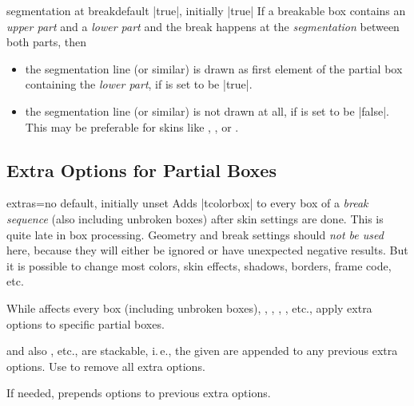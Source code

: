 \begin{docTcbKey}[][doc new=2017-03-20]{segmentation at break}{}{default |true|, initially |true|}
  If a breakable box contains an \emph{upper part} and a \emph{lower part} and
  the break happens at the \emph{segmentation} between both parts, then
  \begin{itemize}
  \item the segmentation line (or similar) is drawn as first element of the
    partial box containing the \emph{lower part}, if 
    is set to be |true|.
  \item the segmentation line (or similar) is not drawn at all, if
     is set to be |false|.
    This may be preferable for skins like , ,
    or .
  \end{itemize}
\end{docTcbKey}


\clearpage
\subsection{Extra Options for Partial Boxes}\label{subsec:extras}


\begin{docTcbKey}[][doc new=2015-07-16]{extras}{=}{no default, initially unset}
  Adds |tcolorbox|  to every box of a \emph{break sequence}
  (also including unbroken boxes) after skin settings are done. This is quite late in box processing.
  Geometry and break settings should \emph{not be used} here, because they
  will either be ignored or have unexpected negative results. But it is possible
  to change most colors, skin effects, shadows, borders, frame code, etc.\par
  While  affects every box (including unbroken boxes),
  , , ,
  , etc., apply extra options to specific partial
  boxes.\par
   and also , etc., are stackable,
  i.\,e., the given  are appended to any previous extra options.
  Use  to remove all extra options.\par
  If needed,  prepends options to previous extra options.
\end{docTcbKey}


